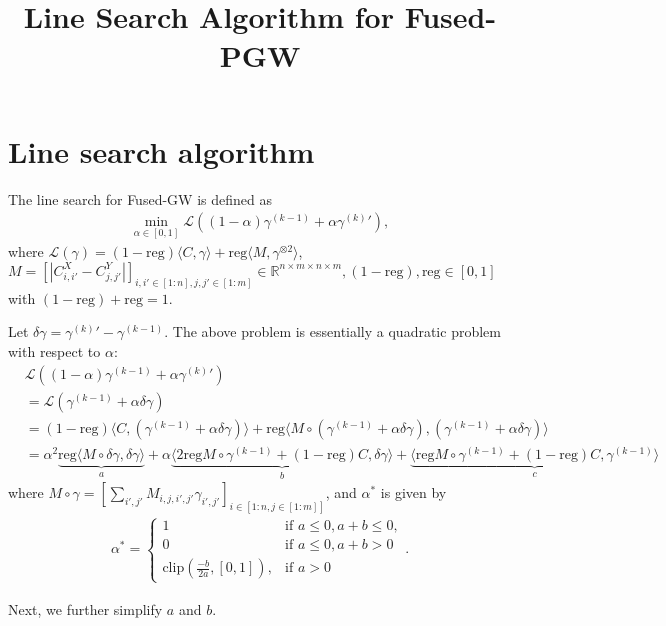 \documentclass[12pt]{article}
\title{Line Search Algorithm for Fused-PGW}
\author{}
\date{} %
\begin{document}
\maketitle

\section{Line search algorithm}
The line search for Fused-GW is defined as 
\begin{align}
\min_{\alpha\in[0,1]}\mathcal{L}((1-\alpha)\gamma^{(k-1)}+\alpha\gamma^{(k)}{'}) \label{eq:line_search_prob_fpgw},
\end{align}
where $\mathcal{L}(\gamma)=(1-\text{reg})\langle C,\gamma \rangle+\text{reg}\langle M,\gamma^{\otimes2} \rangle$, $M=[|C^X_{i,i'}-C^Y_{j,j'}|]_{i,i'\in[1:n],j,j'\in[1:m]}\in \mathbb{R}^{n\times m\times n\times m},(1-\text{reg}),\text{reg}\in[0,1]$ with $(1-\text{reg})+\text{reg}=1$. 

Let $\delta\gamma=\gamma^{(k)}{'}-\gamma^{(k-1)}$. The above problem is essentially a quadratic problem with respect to $\alpha$: 
\begin{align}
&\mathcal{L}((1-\alpha)\gamma^{(k-1)}+\alpha\gamma^{(k)}{'})\nonumber\\
&=\mathcal{L}(\gamma^{(k-1)}+\alpha\delta\gamma)\nonumber\\
&=(1-\text{reg}) \langle C,(\gamma^{(k-1)}+\alpha\delta\gamma) \rangle+\text{reg}\langle M\circ (\gamma^{(k-1)}+\alpha\delta\gamma),(\gamma^{(k-1)}+\alpha\delta\gamma) \rangle \nonumber\\
&=\alpha^2\underbrace{\text{reg}\langle M\circ \delta\gamma,\delta\gamma\rangle}_{a}+\alpha \underbrace{\langle 2\text{reg}M\circ \gamma^{(k-1)}+(1-\text{reg})C,\delta\gamma\rangle}_{b}+\underbrace{\langle \text{reg} M\circ\gamma^{(k-1)}+(1-\text{reg})C,\gamma^{(k-1)}\rangle}_c \nonumber 
\end{align}
where $M\circ \gamma=[\sum_{i',j'}M_{i,j,i',j'}\gamma_{i',j'}]_{i\in[1:n,j\in[1:m]]}$, 
and $\alpha^*$ is given by 
\begin{align}
\alpha^*=\begin{cases}
    1 &\text{if } a\leq 0, a+b\leq 0, \\
    0 &\text{if }a\leq 0, a+b>0\\
    \text{clip}(\frac{-b}{2a},[0,1]), &\text{if }a>0 
\end{cases}\label{eq:line_search_sol_1}. 
\end{align}

Next, we further simplify $a$ and $b$.
\end{document}
